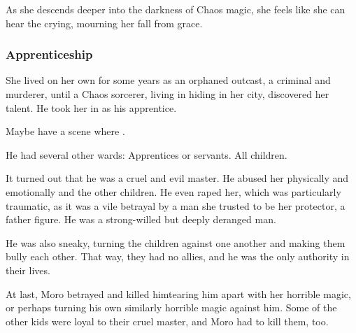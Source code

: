 As she descends deeper into the darkness of Chaos magic, she feels like she can hear the \sephiroth{} crying, mourning her fall from grace.






\subsubsection{Apprenticeship}
She lived on her own for some years as an orphaned outcast, a criminal and murderer, until a Chaos sorcerer, living in hiding in her city, discovered her talent. He took her in as his apprentice. 

Maybe have a scene where . 

He had several other wards: 
Apprentices or servants. All children.

It turned out that he was a cruel and evil master. 
He abused her physically and emotionally and the other children. 
He even raped her, which was particularly traumatic, as it was a vile betrayal by a man she trusted to be her protector, a father figure. 
He was a strong-willed but deeply deranged man. 

He was also sneaky, turning the children against one another and making them bully each other. 
That way, they had no allies, and he was the only authority in their lives.

At last, Moro betrayed and killed him\dash tearing him apart with her horrible magic, or perhaps turning his own similarly horrible magic against him. 
Some of the other kids were loyal to their cruel master, and Moro had to kill them, too. 

